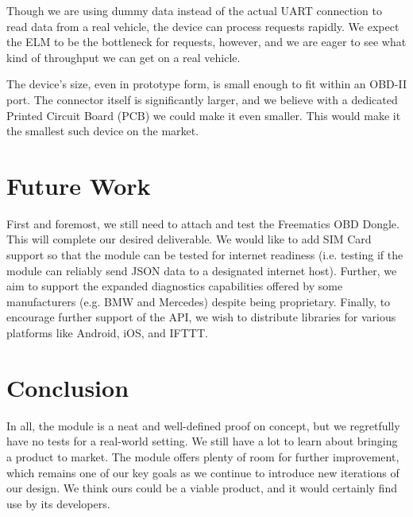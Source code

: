 \documentclass[10pt,letterpaper,unboxed,cm]{article}
\begin{document}
Though we are using dummy data instead of the actual UART connection to read data from a real vehicle, the device can process requests rapidly. We expect the ELM to be the bottleneck for requests, however, and we are eager to see what kind of throughput we can get on a real vehicle.

The device's size, even in prototype form, is small enough to fit within an OBD-II port. The connector itself is significantly larger, and we believe with a dedicated Printed Circuit Board (PCB) we could make it even smaller. This would make it the smallest such device on the market.

\section{Future Work}

First and foremost, we still need to attach and test the Freematics OBD Dongle. This will complete our desired deliverable. We would like to add SIM Card support so that the module can be tested for internet readiness (i.e. testing if the module can reliably send JSON data to a designated internet host). Further, we aim to support the expanded diagnostics capabilities offered by some manufacturers (e.g. BMW and Mercedes) despite being proprietary. Finally, to encourage further support of the API, we wish to distribute libraries for various platforms like Android, iOS, and IFTTT.

\section{Conclusion}

In all, the module is a neat and well-defined proof on concept, but we regretfully have no tests for a real-world setting. We still have a lot to learn about bringing a product to market. The module offers plenty of room for further improvement, which remains one of our key goals as we continue to introduce new iterations of our design. We think ours could be a viable product, and it would certainly find use by its developers.
\end{document}
